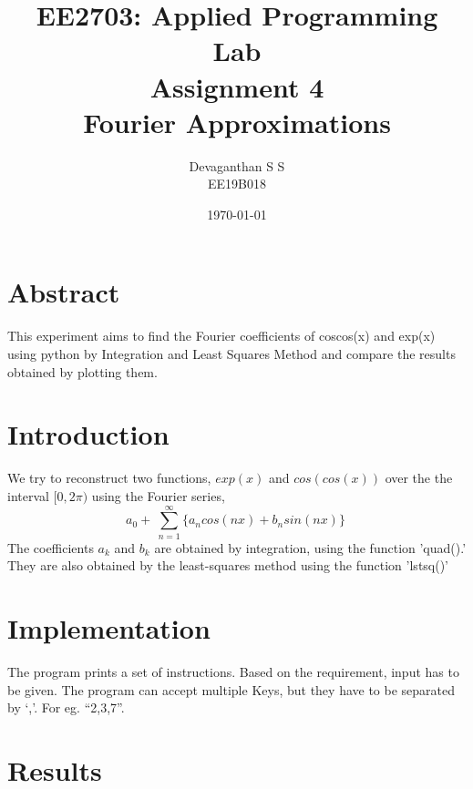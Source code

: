 \documentclass[12pt, a4paper]{report}
\title{\textbf{EE2703: Applied Programming Lab\\Assignment 4\\Fourier Approximations
}}
\author{Devaganthan S S\\ EE19B018}
\date{\today}
\begin{document}
\maketitle


\section{Abstract}
This experiment aims to find the Fourier coefficients of coscos(x) and exp(x) using python by Integration and Least Squares Method and compare the results obtained by plotting them.

\section{Introduction}
We try to reconstruct two functions, $exp(x)$ and $cos(cos(x))$ over the the interval $[0,2\pi)$ using the Fourier series,
\
\begin{equation}\label{eq:4}
a_0 + \ \sum_{n=1}^{\infty} \{a_ncos(nx)+b_nsin(nx)\} \	
\end{equation}
The coefficients $a_k$ and $b_k$ are obtained by integration, using the function{\selectfont
'quad().'
}They are also obtained by the least-squares method using the function {\fontfamily{cmss}\selectfont
'lstsq()'
}
\section{Implementation}
The program prints a set of instructions. Based on the requirement, input has to be given. The program can accept multiple Keys, but they have to be separated by ‘,’. For eg. “2,3,7”.

\section{Results}
\end{document}
